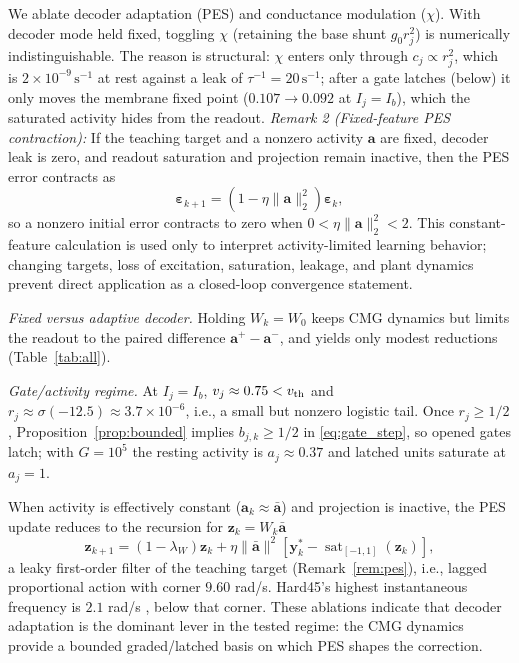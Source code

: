 \documentclass[letterpaper, 10 pt, conference]{ieeeconf}
\newcommand{\sat}{\operatorname{sat}}
\begin{document}
We ablate decoder adaptation (PES) and conductance modulation ($\chi$). With decoder mode held fixed, toggling $\chi$ (retaining the base shunt $g_0r_j^2$) is numerically indistinguishable. The reason is structural: $\chi$ enters only through $c_j\propto r_j^2$, which is $2\times10^{-9}\,\mathrm{s}^{-1}$ at rest against a leak of $\tau^{-1}=20\,\mathrm{s}^{-1}$; after a gate latches (below) it only moves the membrane fixed point ($0.107\to0.092$ at $I_j=I_b$), which the saturated activity hides from the readout.
\textit{Remark 2 (Fixed-feature PES contraction):}\label{rem:pes}
If the teaching target and a nonzero activity $\bm a$ are fixed, decoder leak is zero, and readout saturation and projection remain inactive, then the PES error contracts as
\begin{equation}
 \bm\varepsilon_{k+1}=(1-\eta\|\bm a\|_2^2)\bm\varepsilon_k,
 \label{eq:contraction}
\end{equation}
so a nonzero initial error contracts to zero when $0<\eta\|\bm a\|_2^2<2$. This constant-feature calculation \cite{voelker2015pes} is used only to interpret activity-limited learning behavior; changing targets, loss of excitation, saturation, leakage, and plant dynamics prevent direct application as a closed-loop convergence statement.

\emph{Fixed versus adaptive decoder.} Holding $W_k=W_0$ keeps CMG dynamics but limits the readout to the paired difference $\bm a^+-\bm a^-$, and yields only modest reductions (Table~\ref{tab:all}).

\emph{Gate/activity regime.} At $I_j=I_b$, $v_j\approx0.75<v_{\rm th}$ and $r_j\approx\sigma(-12.5)\approx3.7\times10^{-6}$, i.e., a small but nonzero logistic tail. Once $r_j\ge1/2$, Proposition~\ref{prop:bounded} implies $b_{j,k}\ge1/2$ in \eqref{eq:gate_step}, so opened gates latch; with $G=10^5$ the resting activity is $a_j\approx0.37$ and latched units saturate at $a_j=1$.

When activity is effectively constant ($\bm a_k\approx\bar{\bm a}$) and projection is inactive, the PES update reduces to the recursion for $\bm z_k=W_k\bar{\bm a}$
\begin{equation}
 \bm z_{k+1}=(1-\lambda_W)\bm z_k
 +\eta\|\bar{\bm a}\|^2[\bm y_k^*-\sat_{[-1,1]}(\bm z_k)],
 \label{eq:constantbasis}
\end{equation}
a leaky first-order filter of the teaching target (Remark~\ref{rem:pes}), i.e., lagged proportional action with corner $9.60$ rad/s. Hard45's highest instantaneous frequency is $2.1$ rad/s \cite{sandoval2018instantaneous}, below that corner. These ablations indicate that decoder adaptation is the dominant lever in the tested regime: the CMG dynamics provide a bounded graded/latched basis on which PES shapes the correction.
\end{document}
